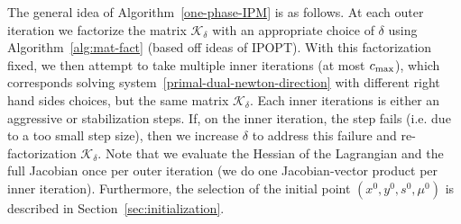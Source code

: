 \documentclass{article}
\begin{document}
The general idea of Algorithm~\ref{one-phase-IPM} is as follows. At each outer iteration we factorize the matrix $\mathcal{K}_{\delta}$ with an appropriate choice of $\delta$ using Algorithm~\ref{alg:mat-fact} (based off ideas of IPOPT). With this factorization fixed, we then attempt to take multiple inner iterations (at most $c_{\max}$), which corresponds solving system~\eqref{primal-dual-newton-direction} with different right hand sides choices, but the same matrix $\mathcal{K}_{\delta}$. Each inner iterations is either an aggressive or stabilization steps. If, on the inner iteration, the step fails (i.e. due to a too small step size), then we increase $\delta$ to address this failure and re-factorization $\mathcal{K}_{\delta}$. Note that we evaluate the Hessian of the Lagrangian and the full Jacobian once per outer iteration (we do one Jacobian-vector product per inner iteration). Furthermore, the selection of the initial point $(x^{0}, y^{0}, s^{0}, \mu^{0})$ is described in Section~\ref{sec:initialization}.

\end{document}
